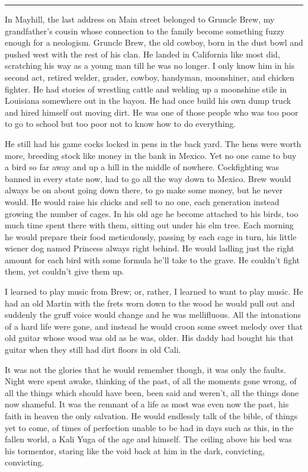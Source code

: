 \documentclass[ebook, 10pt, openright, onecolumn]{memoir}
\newcommand*\starbreak{\fancybreak*{\Large{* * *}}}
\begin{document}
\starbreak

In Mayhill, the last address on Main street belonged to Gruncle Brew, my
grandfather's cousin whose connection to the family become something fuzzy enough
for a neologism.  Gruncle Brew, the old cowboy, born in the dust bowl and pushed
west with the rest of his clan.  He landed in California like most did,
scratching his way as a young man till he was no longer.  I only know him in his
second act, retired welder, grader, cowboy, handyman, moonshiner, and chicken
fighter.  He had stories of wrestling cattle and welding up a moonshine stile in
Louisiana somewhere out in the bayou.  He had once build his own dump truck and
hired himself out moving dirt.  He was one of those people who was too poor to
go to school but too poor not to know how to do everything.

He still had his game cocks locked in pens in the back yard.  The hens
were worth more, breeding stock like money in the bank in Mexico.  Yet no one
came to buy a bird so far away and up a hill in the middle of
nowhere. Cockfighting was banned in every state now, had to go all the way down
to Mexico.  Brew would always be on about going down there, to go make some
money, but he never would.  He would raise his chicks and sell to no one, each
generation instead growing the number of cages.  In his old age he become
attached to his birds, too much time spent there with them, sitting out under
his elm tree.  Each morning he would prepare their food meticulously, passing by
each cage in turn, his little wiener dog named Princess always right behind. He
would ladling just the right amount for each bird with some formula he'll take
to the grave.  He couldn't fight them, yet couldn't give them up.

I learned to play music from Brew; or, rather, I learned to want to play music.
He had an old Martin with the frets worn down to the wood he would pull out and
suddenly the gruff voice would change and he was mellifluous.  All the
intonations of a hard life were gone, and instead he would croon some sweet
melody over that old guitar whose wood was old as he was, older.  His daddy had
bought his that guitar when they still had dirt floors in old Cali.

It was not the glories that he would remember though, it was only the faults.
Night were spent awake, thinking of the past, of all the moments gone wrong, of
all the things which should have been, been said and weren't, all the things
done now shameful.  It was the remnant of a life as most was even now the past,
his faith in heaven the only salvation.  He would endlessly talk of the bible,
of things yet to come, of times of perfection unable to be had in days such as
this, in the fallen world, a Kali Yuga of the age and himself.  The ceiling
above his bed was his tormentor, staring like the void back at him in the dark,
convicting, convicting.
\end{document}
